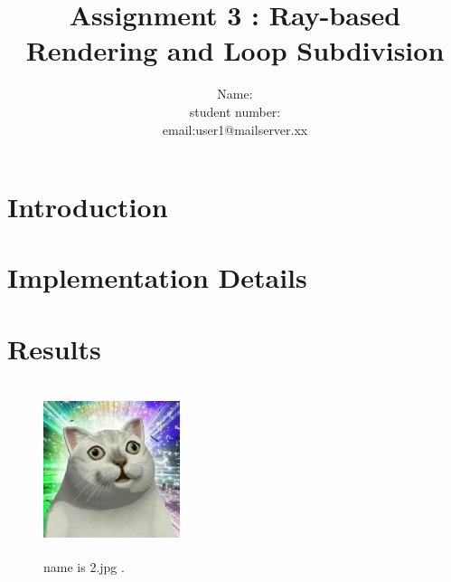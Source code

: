\documentclass[acmtog]{acmart}
\title{Assignment 3 : Ray-based Rendering and Loop Subdivision}
\author{Name:\quad 123213  \\ student number:\quad 123456789
	\\email:\quad user1@mailserver.xx}
\begin{document}
\maketitle

\vspace*{2 ex}


\section{Introduction}

\section{Implementation Details}

\section{Results}

\begin{figure}[h]
\centering
\includegraphics[width=4cm,height=5cm]{2.jpg}
\caption{name is 2.jpg .}
\end{figure}
\end{document}
